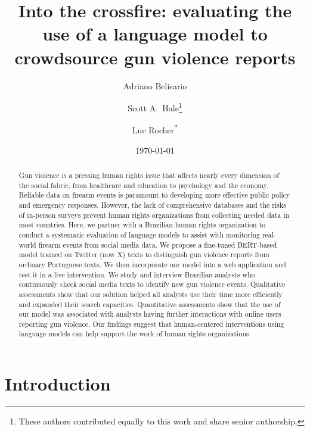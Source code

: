 \documentclass[11pt,letterpaper]{article}
\title{Into the crossfire: evaluating the use of a language model to crowdsource gun violence reports}
\author[1]{Adriano Belisario}
\author[1]{Scott A.\ Hale\thanks{These authors contributed equally to this work and share senior authorship.}}
\author[1]{Luc Rocher\unskip\textsuperscript{*}}
\affil[1]{Oxford Internet Institute, University of Oxford, Oxford, UK}
\date{\today}
\begin{document}
\maketitle
\renewcommand{\thefootnote}{}
\renewcommand{\thefootnote}{\arabic{footnote}}
\begin{abstract}
Gun violence is a pressing human rights issue that affects nearly every dimension of the social fabric, from healthcare and education to psychology and the economy. Reliable data on firearm events is paramount to developing more effective public policy and emergency responses. However, the lack of comprehensive databases and the risks of in-person surveys prevent human rights organizations from collecting needed data in most countries. Here, we partner with a Brazilian human rights organization to conduct a systematic evaluation of language models to assist with monitoring real-world firearm events from social media data. We propose a fine-tuned BERT-based model trained on Twitter (now X) texts to distinguish gun violence reports from ordinary Portuguese texts. We then incorporate our model into a web application and test it in a live intervention. We study and interview Brazilian analysts who continuously check social media texts to identify new gun violence events. Qualitative assessments show that our solution helped all analysts use their time more efficiently and expanded their search capacities. Quantitative assessments show that the use of our model was associated with analysts having further interactions with online users reporting gun violence. Our findings suggest that human-centered interventions using language models can help support the work of human rights organizations.
\end{abstract}


\section{Introduction}

\label{chap:intro}
\end{document}
